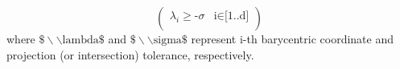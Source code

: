 \begin{equation} \label{eq:projtol}
	\left(
\begin{array}{cc}
 \lambda _i\text{$\geq $-$\sigma $} & \text{i$\in $[1..d]} \\
\end{array}
\right)
\end{equation}
where $\text{$\$\backslash \backslash $lambda$\$$}$ and $\text{$\$\backslash \backslash $sigma$\$$}$ represent i-th barycentric coordinate and projection (or intersection) tolerance, respectively.